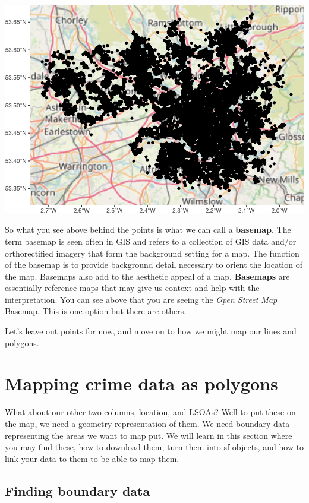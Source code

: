 \documentclass[
]{book}
\begin{document}
\includegraphics{crime_mapping_files/figure-latex/unnamed-chunk-15-1.pdf}

So what you see above behind the points is what we can call a \textbf{basemap}. The term basemap is seen often in GIS and refers to a collection of GIS data and/or orthorectified imagery that form the background setting for a map. The function of the basemap is to provide background detail necessary to orient the location of the map. Basemaps also add to the aesthetic appeal of a map. \textbf{Basemaps} are essentially reference maps that may give us context and help with the interpretation. You can see above that you are seeing the \emph{Open Street Map} Basemap. This is one option but there are others.

Let's leave out points for now, and move on to how we might map our lines and polygons.

\hypertarget{mapping-crime-data-as-polygons}{%
\section{Mapping crime data as polygons}\label{mapping-crime-data-as-polygons}}

What about our other two columns, location, and LSOAs? Well to put these on the map, we need a geometry representation of them. We need boundary data representing the areas we want to map put. We will learn in this section where you may find these, how to download them, turn them into sf objects, and how to link your data to them to be able to map them.

\hypertarget{finding-boundary-data}{%
\subsection{Finding boundary data}\label{finding-boundary-data}}
\end{document}
